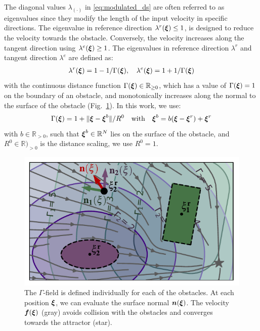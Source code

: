 The  diagonal values $\lambda_{(\cdot)}$ in \eqref{eq:modulated_ds} are often referred to as eigenvalues since they modify the length of the input velocity in specific directions. 
The eigenvalue in reference direction $\lambda^r(\boldsymbol{\xi}) \leq 1$, is designed to reduce the velocity towards the obstacle.  
Conversely, the velocity increases along the tangent direction using $\lambda^e(\boldsymbol{\xi}) \geq 1$. The eigenvalues in reference direction $\lambda^r$ and tangent direction $\lambda^e$ are defined as:
\begin{equation}
\begin{split}
    \lambda^r(\vecs \xi) = 1 - 1 /\Gamma(\vecs \xi) , \quad \lambda^e(\vecs \xi) = 1 + 1 / \Gamma(\vecs \xi)
    \label{eq:eigenvalues}
    \end{split}
\end{equation}
with the continuous distance function $\Gamma(\boldsymbol{\xi}) \in \mathbb{R}_{\geq 0}$, which has a value of $\Gamma(\boldsymbol{\xi}) = 1$ on the boundary of an obstacle, and monotonically increases along the normal to the surface of the obstacle (Fig.~\ref{fig:resultant_normal}). In this work, we use:
\begin{equation}
  \Gamma(\vecs \xi) = 1 + \| \vecs \xi - \vecs \xi^b \|  / R^0
  \quad \text{with} \quad
  \vecs \xi^b = b (\vecs \xi - \vecs \xi^r) + \vecs \xi^r
  \label{eq:distance_function}
\end{equation}
with $b \in \mathbb{R}_{>0}$, such that $\boldsymbol{\xi}^b \in \mathbb{R}^N$ lies on the surface of the obstacle, and $R^0 \in \mathbb{R})_{>0}$ is the distance scaling, we use $R^0 = 1$.

\begin{figure}
\centerline{\includegraphics[width=0.7\columnwidth]{figures/normal_and_gamma_field_visualization_annotated.pdf}}
\caption{
The $\Gamma$-field is defined individually for each of the obstacles. At each position $\boldsymbol{\xi}$, we can evaluate the surface normal $\boldsymbol{n}(\boldsymbol{\xi})$. 
The velocity $\boldsymbol{f}(\boldsymbol{\xi})$ (gray) avoids collision with the obstacles and converges towards the attractor (star).}
\label{fig:resultant_normal}
\end{figure}

